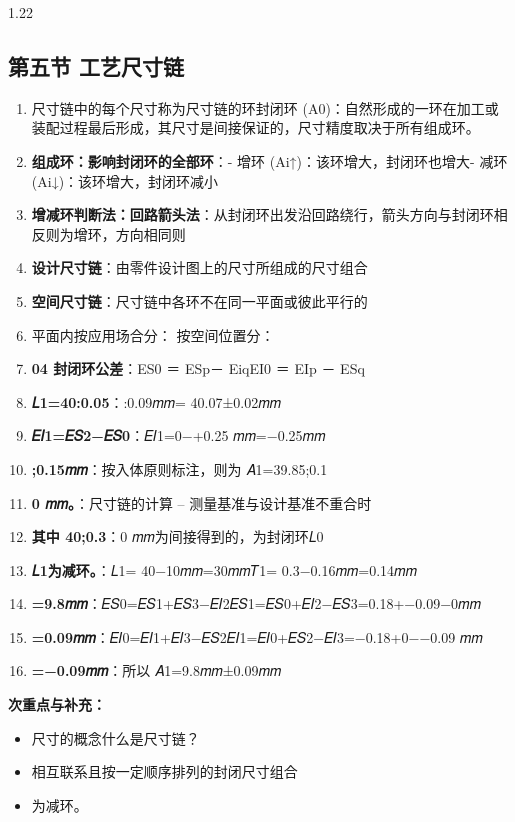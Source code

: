 \documentclass[12pt,a4paper]{article}
\begin{document}
\begin{spacing}{1.22}
\subsection{第五节 工艺尺寸链}
\begin{tcolorbox}[colback=yellow!6,colframe=red!55!black,title=重点,left=1mm,right=1mm]
\begin{enumerate}[leftmargin=2.2em,label=\arabic*.]
  \item 尺寸链中的每个尺寸称为尺寸链的环封闭环 (A0)：自然形成的一环在加工或装配过程最后形成，其尺寸是间接保证的，尺寸精度取决于所有组成环。
  \item \textbf{组成环：影响封闭环的全部环}：- 增环 (Ai↑)：该环增大，封闭环也增大- 减环 (Ai↓)：该环增大，封闭环减小
  \item \textbf{增减环判断法：回路箭头法}：从封闭环出发沿回路绕行，箭头方向与封闭环相反则为增环，方向相同则
  \item \textbf{设计尺寸链}：由零件设计图上的尺寸所组成的尺寸组合
  \item \textbf{空间尺寸链}：尺寸链中各环不在同一平面或彼此平行的
  \item 平面内按应用场合分： 按空间位置分：
  \item \textbf{04 封闭环公差}：ES0 ＝ ESp－ EiqEI0 ＝ EIp － ESq
  \item \textbf{𝐿1=40:0.05}：:0.09𝑚𝑚= 40.07±0.02𝑚𝑚
  \item \textbf{𝐸𝐼1=𝐸𝑆2−𝐸𝑆0}：𝐸𝐼1=0−+0.25 𝑚𝑚=−0.25𝑚𝑚
  \item \textbf{;0.15𝑚𝑚}：按入体原则标注，则为 𝐴1=39.85;0.1
  \item \textbf{0 𝑚𝑚。}：尺寸链的计算 – 测量基准与设计基准不重合时
  \item \textbf{其中 40;0.3}：0 𝑚𝑚为间接得到的，为封闭环𝐿0
  \item \textbf{𝐿1为减环。}：𝐿1= 40−10𝑚𝑚=30𝑚𝑚𝑇1= 0.3−0.16𝑚𝑚=0.14𝑚𝑚
  \item \textbf{=9.8𝑚𝑚}：𝐸𝑆0=𝐸𝑆1+𝐸𝑆3−𝐸𝐼2𝐸𝑆1=𝐸𝑆0+𝐸𝐼2−𝐸𝑆3=0.18+−0.09−0𝑚𝑚
  \item \textbf{=0.09𝑚𝑚}：𝐸𝐼0=𝐸𝐼1+𝐸𝐼3−𝐸𝑆2𝐸𝐼1=𝐸𝐼0+𝐸𝑆2−𝐸𝐼3=−0.18+0−−0.09 𝑚𝑚
  \item \textbf{=−0.09𝑚𝑚}：所以 𝐴1=9.8𝑚𝑚±0.09𝑚𝑚
\end{enumerate}
\end{tcolorbox}
\noindent\textbf{次重点与补充：}
\begin{itemize}[leftmargin=2.2em,label=--]
  \item 尺寸的概念什么是尺寸链？
  \item 相互联系且按一定顺序排列的封闭尺寸组合
  \item 为减环。

\end{itemize}
\end{spacing}
\end{document}
